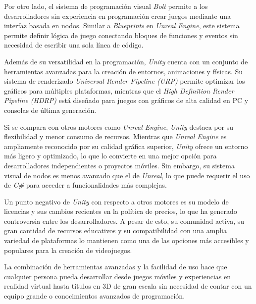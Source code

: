 Por otro lado, el sistema de programación visual \textit{Bolt} permite a los desarrolladores sin experiencia en programación crear juegos mediante una interfaz basada en nodos. Similar a \textit{Blueprints} en \textit{Unreal Engine}, este sistema permite definir lógica de juego conectando bloques de funciones y eventos sin necesidad de escribir una sola línea de código.\

Además de su versatilidad en la programación, \textit{Unity} cuenta con un conjunto de herramientas avanzadas para la creación de entornos, animaciones y físicas. Su sistema de renderizado \textit{Universal Render Pipeline (URP)} permite optimizar los gráficos para múltiples plataformas, mientras que el \textit{High Definition Render Pipeline (HDRP)} está diseñado para juegos con gráficos de alta calidad en PC y consolas de última generación.\

Si se compara con otros motores como \textit{Unreal Engine}, \textit{Unity} destaca por su flexibilidad y menor consumo de recursos. Mientras que \textit{Unreal Engine} es ampliamente reconocido por su calidad gráfica superior, \textit{Unity} ofrece un entorno más ligero y optimizado, lo que lo convierte en una mejor opción para desarrolladores independientes o proyectos móviles. Sin embargo, su sistema visual de nodos es menos avanzado que el de \textit{Unreal}, lo que puede requerir el uso de \textit{C\#} para acceder a funcionalidades más complejas.\

Un punto negativo de \textit{Unity} con respecto a otros motores es su modelo de licencias y sus cambios recientes en la política de precios, lo que ha generado controversia entre los desarrolladores. A pesar de esto, su comunidad activa, su gran cantidad de recursos educativos y su compatibilidad con una amplia variedad de plataformas lo mantienen como una de las opciones más accesibles y populares para la creación de videojuegos.

La combinación de herramientas avanzadas y la facilidad de uso hace que cualquier persona pueda desarrollar desde juegos móviles y experiencias en realidad virtual hasta títulos en 3D de gran escala sin necesidad de contar con un equipo grande o conocimientos avanzados de programación.

